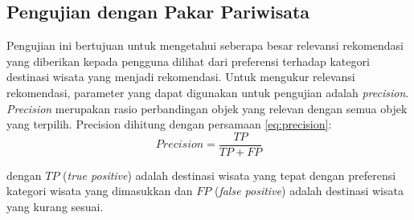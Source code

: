 \subsection{Pengujian dengan Pakar Pariwisata}
\par
Pengujian ini bertujuan untuk mengetahui seberapa besar relevansi rekomendasi yang diberikan kepada pengguna dilihat dari preferensi terhadap
kategori destinasi wisata yang menjadi rekomendasi. Untuk mengukur relevansi rekomendasi, parameter yang dapat digunakan untuk
pengujian adalah \textit{precision}\cite{arnett2015recommender}\cite{chen2012recommendation}.
\textit{Precision} merupakan rasio perbandingan objek yang relevan dengan semua objek yang terpilih. Precision dihitung dengan persamaan \ref{eq:precision}:
\begin{equation}
Precision = \frac{TP}{TP + FP}
\label{eq:precision} 
\end{equation}
\par
dengan $TP$ (\textit{true positive}) adalah destinasi wisata yang tepat dengan preferensi kategori wisata yang dimasukkan dan $FP$ 
(\textit{false positive}) adalah destinasi wisata yang kurang sesuai.

